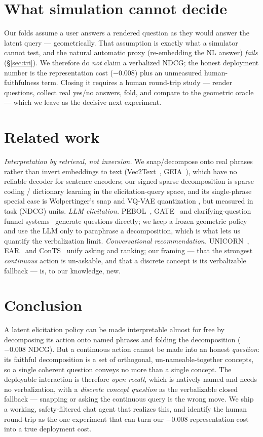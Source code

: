 \documentclass[11pt]{article}
\begin{document}
\section{What simulation cannot decide}\label{sec:human}
Our folds assume a user answers a rendered question as they would answer the latent query --- geometrically. That
assumption is exactly what a simulator cannot test, and the natural automatic proxy (re-embedding the NL answer)
\emph{fails} (\S\ref{sec:tri}). We therefore do \emph{not} claim a verbalized NDCG; the honest deployment number is
the representation cost ($-0.008$) plus an unmeasured human-faithfulness term. Closing it requires a human round-trip
study --- render questions, collect real yes/no answers, fold, and compare to the geometric oracle --- which we leave
as the decisive next experiment.

\section{Related work}
\emph{Interpretation by retrieval, not inversion.} We snap/decompose onto real phrases rather than invert embeddings
to text (Vec2Text~\citep{vec2text}, GEIA~\citep{geia}), which have no reliable decoder for sentence encoders; our signed
sparse decomposition is sparse coding / dictionary learning \citep{omp} in the elicitation-query space, and its
single-phrase special case is Wolpertinger's snap \citep{wolpertinger} and VQ-VAE quantization \citep{vqvae}, but
measured in task (NDCG) units. \emph{LLM elicitation.} PEBOL~\citep{pebol}, GATE~\citep{gate} and clarifying-question
funnel systems~\citep{montazeralghaem25} generate questions directly; we keep a frozen geometric policy and use the LLM
only to paraphrase a decomposition, which is what lets us quantify the verbalization limit. \emph{Conversational
recommendation.} UNICORN~\citep{unicorn}, EAR~\citep{ear} and ConTS~\citep{conts} unify asking and ranking; our
framing --- that the strongest \emph{continuous} action is un-askable, and that a discrete concept is its verbalizable
fallback --- is, to our knowledge, new.

\section{Conclusion}
A latent elicitation policy can be made interpretable almost for free by decomposing its action onto named phrases
and folding the decomposition ($-0.008$ NDCG). But a continuous action cannot be made into an honest \emph{question}:
its faithful decomposition is a set of orthogonal, un-nameable-together concepts, so a single coherent question
conveys no more than a single concept. The deployable interaction is therefore \emph{open recall}, which is natively
named and needs no verbalization, with a \emph{discrete concept question} as the verbalizable closed fallback ---
snapping or asking the continuous query is the wrong move. We ship a working, safety-filtered chat agent that realizes
this, and identify the human round-trip as the one experiment that can turn our $-0.008$ representation cost into a
true deployment cost.
\end{document}
